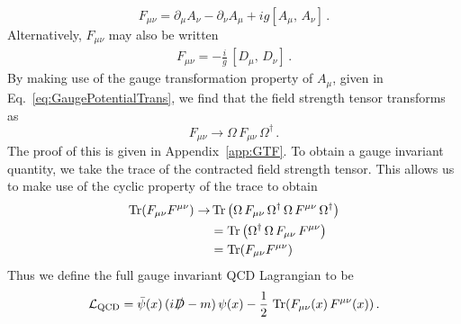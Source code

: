 %
\begin{equation}
F_{\mu\nu}=\partial_\mu A_\nu - \partial_\nu A_\mu + ig[A_\mu,\,A_\nu]\, .
\label{eq:FieldStrengthTensor}
\end{equation}
%
Alternatively, $F_{\mu\nu}$ may also be written
%
\begin{align}
F_{\mu\nu} = -\frac{i}{g}\,[D_\mu,\, D_\nu]\, .
\end{align}
%
By making use of the gauge transformation property of $A_\mu$, given in Eq.~\eqref{eq:GaugePotentialTrans}, we find that the field strength tensor transforms as
%
\begin{equation}
F_{\mu\nu}\rightarrow \Omega\,F_{\mu\nu}\, \Omega^\dagger\, .
\end{equation}
%
The proof of this is given in Appendix~\ref{app:GTF}. To obtain a gauge invariant quantity, we take the trace of the contracted field strength tensor. This allows us to make use of the cyclic property of the trace to obtain
%
\begin{align}
\operatorname{Tr}(F_{\mu\nu}F^{\mu\nu})\rightarrow &\operatorname{Tr}\left(\Omega\,F_{\mu\nu}\, \Omega^\dagger\,\Omega\,F^{\mu\nu}\, \Omega^\dagger\right)\nonumber\\
&=\operatorname{Tr}\left(\Omega^\dagger \, \Omega\,F_{\mu\nu}\,F^{\mu\nu}\right)\nonumber\\
&=\operatorname{Tr}(F_{\mu\nu}F^{\mu\nu})
\end{align}
Thus we define the full gauge invariant QCD Lagrangian to be
%
\begin{equation}
\mathcal{L_{\text{QCD}}}=\bar{\psi}(x)\,(i\slashed{D}-m)\,\psi(x)-\frac{1}{2}\,\operatorname{Tr}(F_{\mu\nu}(x)\,F^{\mu\nu}(x))\, .
\label{eq:QCDLagrangian}
\end{equation}\\


